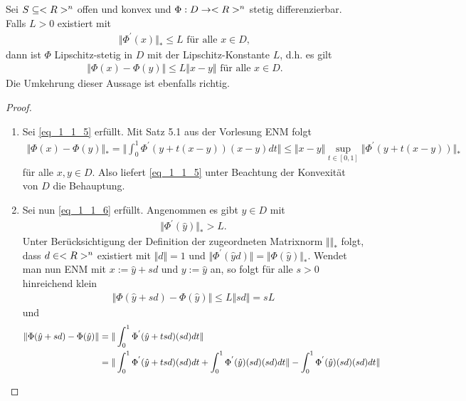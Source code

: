 \begin{lemma}
	Sei $S \subseteq <R>^n$ offen und konvex und $\Phi: D \to <R>^n$ stetig differenzierbar. Falls $L > 0$ existiert mit
	\begin{align}
		\Vert \Phi^{'}(x) \Vert_{\ast} \le L \text{ für alle } x \in D, \label{eq_1_1_5}
	\end{align}
	dann ist $\Phi$ Lipschitz-stetig in $D$ mit der Lipschitz-Konstante $L$, d.h. es gilt
	\begin{align}
		\Vert \Phi(x) - \Phi(y)\Vert \le L \Vert x-y \Vert \text{ für alle } x \in D. \label{eq_1_1_6}
	\end{align}
	Die Umkehrung dieser Aussage ist ebenfalls richtig.
\end{lemma}

\begin{proof}
	\begin{enumerate}
		\item Sei \ref{eq_1_1_5} erfüllt. Mit Satz 5.1 aus der Vorlesung ENM folgt %
		\begin{align}
		\Vert \Phi(x) - \Phi(y) \Vert_{\ast} = \Vert \int_{0}^{1} \Phi^{'}(y + t(x-y))(x-y) dt \Vert \le \Vert x-y \Vert \sup_{t \in [0,1]} \Vert \Phi^{'}(y+t(x-y))\Vert_{\ast}
		\end{align}
		für alle $x,y \in D$. Also liefert \ref{eq_1_1_5} unter Beachtung der Konvexität von $D$ die Behauptung.
		\item Sei nun \ref{eq_1_1_6} erfüllt. Angenommen es gibt $\hat{y} \in D$ mit
		\begin{align}
			\Vert \Phi^{'}(\hat{y})\Vert_{\ast} > L. \label{eq_1_1_7}
		\end{align}
		Unter Berücksichtigung der Definition der zugeordneten Matrixnorm $\Vert \Vert_{\ast}$ folgt, dass $d \in <R>^n$ existiert mit $\Vert d \Vert = 1$ und $\Vert \Phi^{'}(\hat{y}d)\Vert = \Vert \Phi(\hat{y}) \Vert_{\ast}$. Wendet man nun ENM mit $x := \hat{y} + sd$ und $y := \hat{y}$ an, so folgt für alle $s > 0$ hinreichend klein
		\begin{align}
			\Vert \Phi(\hat{y} + sd) - \Phi(\hat{y})\Vert \le L \Vert sd \Vert = sL
		\end{align}
		und 
		\begin{align}
			\Vert \Phi(\hat{y} + sd) - \Phi(\hat{y})\Vert &= \Vert \int_{0}^{1} \Phi^{'}(\hat{y} + tsd)(sd)dt\Vert\notag \\
			&= \Vert \int_{0}^{1} \Phi^{'}(\hat{y} + tsd)(sd)dt + \int_{0}^{1} \Phi^{'}(\hat{y})(sd)(sd)dt\Vert - \int_{0}^{1} \Phi^{'}(\hat{y})(sd)(sd)dt\Vert\notag \\

\end{align}
\end{enumerate}
\end{proof}
